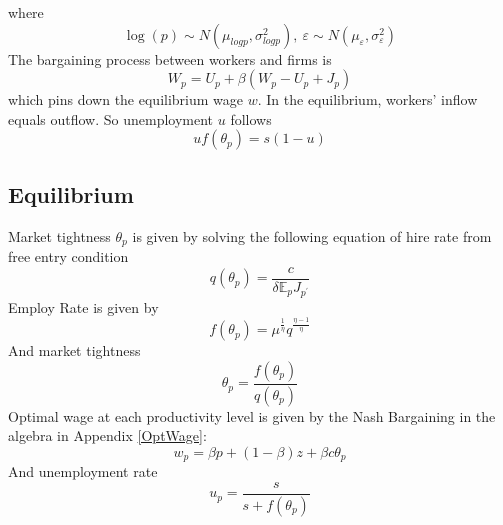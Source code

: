 \documentclass[10pt]{article} %
\begin{document}
        where \[\log(p) \sim N(\mu_{logp}, \sigma^2_{logp}),\ 
        \varepsilon \sim N(\mu_\varepsilon,\sigma^2_\varepsilon)\]
    The bargaining process between workers and firms is 
    \begin{equation}
        W_p = U_p + \beta (W_p - U_p + J_p)
    \end{equation} which pins down the equilibrium wage \(w\).\newline
    In the equilibrium, workers' inflow equals outflow. So unemployment \(u\) follows
    \[u f(\theta_p) = s(1-u)\]
    
    \subsection{Equilibrium}
    Market tightness \(\theta_p\) is given by solving the following equation of hire rate from free entry condition 
    \begin{equation}\label{HireRate}
    q(\theta_p) = \frac{c}{\delta \mathbb{E}_p J_{p^\prime}}\end{equation}
    Employ Rate is given by \begin{equation}\label{EmployRate}
    f(\theta_p) = \mu^\frac{1}{\eta} q^\frac{\eta-1}{\eta}\end{equation}
    And market tightness \begin{equation}\label{MarketTightness}
    \theta_p = \frac{f(\theta_p)}{q(\theta_p)}\end{equation}
    Optimal wage at each productivity level is given by the Nash Bargaining in the algebra in Appendix \ref{OptWage}: 
    \begin{equation}\label{OptimalWage}
        w_p = \beta p + (1-\beta)z + \beta c \theta_p\end{equation}
    And unemployment rate \begin{equation}\label{UnemployRate}
        u_p = \frac{s}{s + f(\theta_p)}\end{equation}
    
\end{document}
